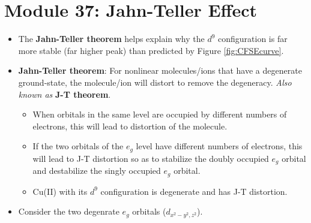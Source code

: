 \documentclass[../notes.tex]{subfiles}
\begin{document}
\section{Module 37: Jahn-Teller Effect}
\begin{itemize}
    \item The \textbf{Jahn-Teller theorem} helps explain why the $d^9$ configuration is far more stable (far higher peak) than predicted by Figure \ref{fig:CFSEcurve}.
    \item \textbf{Jahn-Teller theorem}: For nonlinear molecules/ions that have a degenerate ground-state, the molecule/ion will distort to remove the degeneracy. \emph{Also known as} \textbf{J-T theorem}.
    \begin{itemize}
        \item When orbitals in the same level are occupied by different numbers of electrons, this will lead to distortion of the molecule.
        \item If the two orbitals of the $e_g$ level have different numbers of electrons, this will lead to J-T distortion so as to stabilize the doubly occupied $e_g$ orbital and destabilize the singly occupied $e_g$ orbital.
        \item Cu(II) with its $d^9$ configuration is degenerate and has J-T distortion.
    \end{itemize}
    \item Consider the two degenrate $e_g$ orbitals ($d_{x^2-y^2,z^2}$).
    \begin{figure}[h!]
        \centering
\end{figure}
\end{itemize}
\end{document}
